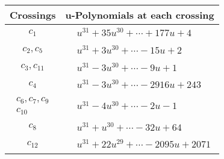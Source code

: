 \documentclass[1p]{elsarticle_modified}
\theoremstyle{definition}
\begin{document}
\begin{tabular}{m{50pt}|m{274pt}}
Crossings & \hspace{64pt}u-Polynomials at each crossing \\
\hline $$\begin{aligned}c_{1}\end{aligned}$$&$\begin{aligned}
&u^{31}+35 u^{30}+\cdots+177 u+4
\end{aligned}$\\
\hline $$\begin{aligned}c_{2},c_{5}\end{aligned}$$&$\begin{aligned}
&u^{31}+3 u^{30}+\cdots-15 u+2
\end{aligned}$\\
\hline $$\begin{aligned}c_{3},c_{11}\end{aligned}$$&$\begin{aligned}
&u^{31}-3 u^{30}+\cdots-9 u+1
\end{aligned}$\\
\hline $$\begin{aligned}c_{4}\end{aligned}$$&$\begin{aligned}
&u^{31}-3 u^{30}+\cdots-2916 u+243
\end{aligned}$\\
\hline $$\begin{aligned}c_{6},c_{7},c_{9}\\c_{10}\end{aligned}$$&$\begin{aligned}
&u^{31}-4 u^{30}+\cdots-2 u-1
\end{aligned}$\\
\hline $$\begin{aligned}c_{8}\end{aligned}$$&$\begin{aligned}
&u^{31}+u^{30}+\cdots-32 u+64
\end{aligned}$\\
\hline $$\begin{aligned}c_{12}\end{aligned}$$&$\begin{aligned}
&u^{31}+22 u^{29}+\cdots-2095 u+2071
\end{aligned}$\\
\hline
\end{tabular}\\~\\
\end{document}
